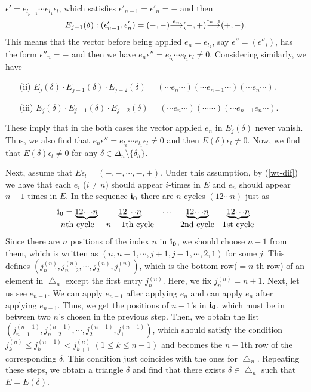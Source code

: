 ${\epsilon}'=e_{l_{p-1}}{\cdots} e_{l_1}{\epsilon}_l$, 
which satisfies ${\epsilon}'_{n-1}={\epsilon}'_{n}=-$ and then 
\[
E_{j-1}({\delta}):
 ({\epsilon}'_{n-1},{\epsilon}'_n)=(-,-){\smash{\mathop{\longrightarrow}\limits^{{e_n}}}}(-,+){\smash{\mathop{\longrightarrow}\limits^{{e_{n-1}}}}}(+,-).
\]
This means that the vector before being applied $e_n=e_{l_k}$, 
say ${\epsilon}''=({\epsilon}''_i)$, has the form ${\epsilon}''_n=-$ and then 
we have $e_n{\epsilon}''=e_{l_k}{\cdots} e_{l_1}{\epsilon}_l\ne 0$.
Considering similarly, we have 
\begin{enumerate}
\item[(ii)] $E_j({\delta})\cdot E_{j-1}({\delta})\cdot E_{j-2}({\delta})
=({\cdots} e_n{\cdots})({\cdots} e_{n-1}{\cdots})({\cdots} e_n{\cdots})$.
\item[(iii)] $E_j({\delta})\cdot E_{j-1}({\delta})\cdot E_{j-2}({\delta})
=({\cdots} e_n{\cdots})({\cdots} {\cdots})({\cdots} e_{n-1}e_n{\cdots})$.
\end{enumerate}
These imply that in the both cases the vector applied $e_n$ in 
$E_j({\delta})$ never vanish. Thus, we also find that 
$e_n{\epsilon}''=e_{l_k}{\cdots} e_{l_1}{\epsilon}_l\ne 0$ and then 
$E({\delta}){\epsilon}_l\ne0$. Now, we find that $E({\delta}){\epsilon}_l\ne0$ for any 
${\delta}\in {\Delta}_n\setminus\{{\delta}_h\}$.

Next, assume that $E{\epsilon}_l=(-,-,{\cdots},-,+)$.
Under this assumption, by (\ref{wt-dif}) we have that each 
$e_i$ ($i\ne n$) should appear  $i$-times in $E$ and 
$e_n$ should appear $n-1$-times in $E$.
In the sequence $\bfii0$ there are $n$ cycles $(12{\cdots} n)$ just as
\[
\begin{array}{ccccc}
\bfii0= \underbrace{12{\cdots} n}& \underbrace{12{\cdots} n}&
{\cdots}  &\underbrace{12{\cdots} n}&\underbrace{12{\cdots} n}\\
n\text{th cycle}&n-1\text{th cycle}&&2\text{nd cycle}&1
\text{st cycle}
\end{array}
\]
Since there are $n$ positions of the index $n$ in $\bfii0$,
we should choose $n-1$ from them, which is written as 
$(n,n-1,{\cdots},j+1,j-1,{\cdots},2,1)$ for some $j$.
This defines 
$({j_{n-1}^{(n)}},{j_{n-2}^{(n)}},{\cdots},{j_{2}^{(n)}},{j_{1}^{(n)}})$, which is 
the bottom row($=n$-th row) of an element in ${\bigtriangleup}_n$
except the first entry ${j_{n}^{(n)}}$. Here, we fix ${j_{n}^{(n)}}=n+1$.
Next, let us see $e_{n-1}$.
We can apply $e_{n-1}$ after applying $e_n$ and can apply 
$e_n$ after applying $e_{n-1}$. 
Thus, we get the positions of $n-1$'s in $\bfii0$, 
which must be in between two $n$'s chosen in the previous step.
Then, we obtain the list
$({j_{n-1}^{(n-1)}},{j_{n-2}^{(n-1)}},{\cdots},{j_{2}^{(n-1)}},{j_{1}^{(n-1)}})$, which 
should satisfy the condition ${j_{k}^{(n)}}\leq {j_{k}^{(n-1)}}<{j_{k+1}^{(n)}}$
$(1\leq k\leq n-1)$ and becomes the $n-1$th 
row of the corresponding ${\delta}$.
This condition just coincides with the ones for ${\bigtriangleup}_n$.
Repeating these steps, we obtain a triangle ${\delta}$ 
and find that there exists ${\delta}\in{\bigtriangleup}_n$ such that $E=E({\delta})$.
{\hfill\framebox[2mm]{}}

